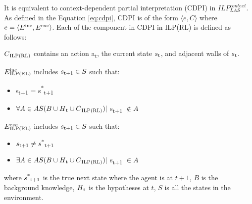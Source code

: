 It is equivalent to context-dependent partial interpretation (CDPI) in  $ILP_{LAS}^{context}$. 
As defined in the Equation \ref{eq:cdpi}, CDPI is of the form $\langle e, C \rangle$ where $e = \langle E\textsuperscript{inc}, E\textsuperscript{exc} \rangle$. 
Each of the component in CDPI in ILP(RL) is defined as follows:

\begin{defn}\label{def:ILPRL_context}
$C\textsubscript{ILP(RL)}$ contains an action a\textsubscript{t}, the current state $s\textsubscript{t}$, and adjacent walls of $s\textsubscript{t}$.
\label{def:context}
\end{defn}

\begin{defn} \label{def:ILPRL_inc}
$E\SPSB{inc}{ILP(RL)}$ includes $s\textsubscript{t+1} \in S$ such that:
\begin{itemize}
\item s\textsubscript{t+1} = s\textsuperscript{*}\textsubscript{t+1}
\item $ \forall A \in AS(B \cup H\textsubscript{t} \cup C\textsubscript{ILP(RL)})|$ s\textsubscript{t+1} $\not\in A$
\end{itemize}
\end{defn}

\begin{defn} \label{def:ILPRL_exc}
$E\SPSB{exc}{ILP(RL)}$ includes $s\textsubscript{t+1} \in S$ such that:
\begin{itemize}
\item $s\textsubscript{t+1} \neq s\textsuperscript{*}\textsubscript{t+1}$
\item $ \exists A \in AS(B \cup H\textsubscript{t} \cup C\textsubscript{ILP(RL)})|$ s\textsubscript{t+1} $\in A$
\end{itemize}
\end{defn}

where $s\textsuperscript{*}\textsubscript{t+1}$ is the true next state where the agent is at $t+1$, 
$B$ is the background knowledge, $H\textsubscript{t}$ is the hypotheses at $t$, $S$ is all the states in the environment.



